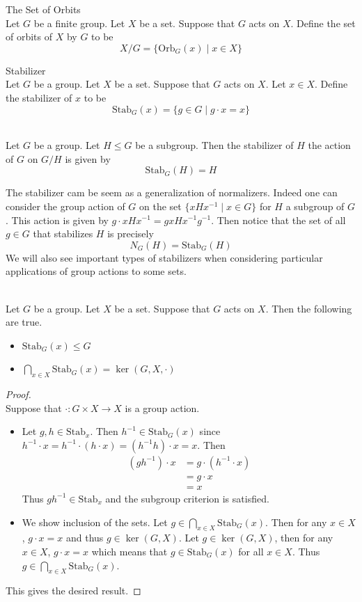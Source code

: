 \documentclass[a4paper]{article}
\begin{document}
\begin{defn}{The Set of Orbits}{}\\
Let $G$ be a finite group. Let $X$ be a set. Suppose that $G$ acts on $X$. Define the set of orbits of $X$ by $G$ to be $$X/G=\{\text{Orb}_G(x)\;|\;x\in X\}$$
\end{defn}

\begin{defn}{Stabilizer}{}\\
Let $G$ be a group. Let $X$ be a set. Suppose that $G$ acts on $X$. Let $x\in X$. Define the stabilizer of $x$ to be $$\text{Stab}_G(x)=\{g\in G\;|\;g\cdot x=x\}$$
\end{defn}

\begin{eg}{}{}\\
Let $G$ be a group. Let $H\leq G$ be a subgroup. Then the stabilizer of $H$ the action of $G$ on $G/H$ is given by $$\text{Stab}_G(H)=H$$
\end{eg}

The stabilizer cam be seem as a generalization of normalizers. Indeed one can consider the group action of $G$ on the set $\{xHx^{-1}\;|\;x\in G\}$ for $H$ a subgroup of $G$. This action is given by $g\cdot xHx^{-1}=gxHx^{-1}g^{-1}$. Then notice that the set of all $g\in G$ that stabilizes $H$ is precisely $$N_G(H)=\text{Stab}_G(H)$$ We will also see important types of stabilizers when considering particular applications of group actions to some sets. 

\begin{prp}{}{}\\
Let $G$ be a group. Let $X$ be a set. Suppose that $G$ acts on $X$. Then the following are true. 
\begin{itemize}
\item $\text{Stab}_G(x)\leq G$ 
\item $\bigcap_{x\in X}\text{Stab}_G(x)=\ker(G,X,\cdot)$
\end{itemize}
\begin{proof}\\
Suppose that $\cdot:G\times X\to X$ is a group action. 
\begin{itemize}
\item Let $g,h\in\text{Stab}_x$. Then $h^{-1}\in\text{Stab}_G(x)$ since $h^{-1}\cdot x=h^{-1}\cdot(h\cdot x)=(h^{-1}h)\cdot x=x$. Then
\begin{align*}
(gh^{-1})\cdot x&=g\cdot(h^{-1}\cdot x)\\
&=g\cdot x\\
&=x
\end{align*}
Thus $gh^{-1}\in\text{Stab}_x$ and the subgroup criterion is satisfied. 
\item We show inclusion of the sets. Let $g\in\bigcap_{x\in X}\text{Stab}_G(x)$. Then for any $x\in X$, $g\cdot x=x$ and thus $g\in\ker(G,X)$. Let $g\in\ker(G,X)$, then for any $x\in X$, $g\cdot x=x$ which means that $g\in\text{Stab}_G(x)$ for all $x\in X$. Thus $g\in\bigcap_{x\in X}\text{Stab}_G(x)$. 
\end{itemize}
This gives the desired result. 
\end{proof}
\end{prp}
\end{document}
